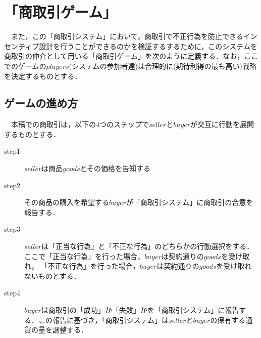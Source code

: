 \documentclass[twocolumn, a4j]{article}
\begin{document}
\section{「商取引ゲーム」}
　また，この「商取引システム」において，商取引で不正行為を防止できるインセンティブ設計を行うことができるのかを検証するするために，このシステムを商取引の仲介として用いる「商取引ゲーム」を次のように定義する．なお，ここでのゲームの$players$(システムの参加者達)は合理的に(期待利得の最も高い)戦略を決定するものとする．

\subsection{ゲームの進め方}
　本稿での商取引は，以下の4つのステップで$seller$と$buyer$が交互に行動を展開するものとする．

\begin{description}
  \item[step1] $seller$は商品$goods$とその価格を告知する
  \item[step2]  その商品の購入を希望する$buyer$が「商取引システム」に商取引の合意を報告する．
  \item[step3]  $seller$は「正当な行為」と「不正な行為」のどちらかの行動選択をする．ここで「正当な行為」を行った場合，$buyer$は契約通りの$goods$を受け取れ， 「不正な行為」を行った場合，$buyer$は契約通りの$goods$を受け取れないものとする．
  \item[step4]  $buyer$は商取引の「成功」か「失敗」かを「商取引システム」に報告する．この報告に基づき，「商取引システム」は$ seller$と$ buyer$の保有する通貨の量を調整する．
\end{description}

%
%
%
\end{document}
